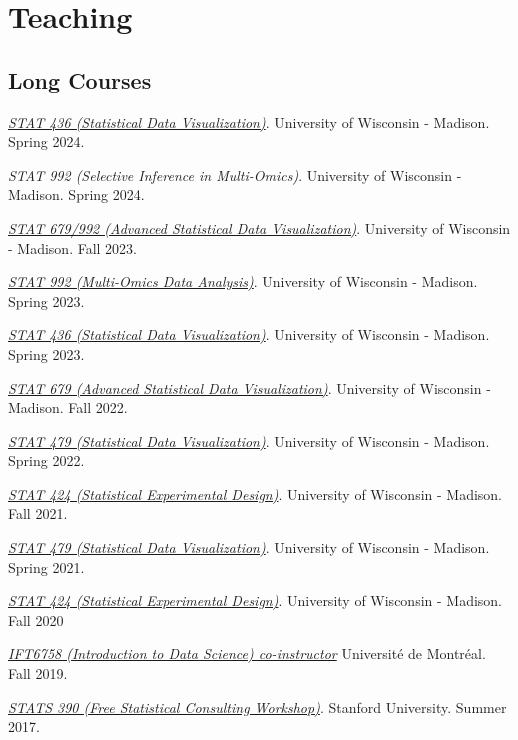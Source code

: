 \documentclass[letterpaper]{article}
\renewenvironment{itemize}{
  \begin{list}{}{
    \setlength{\leftmargin}{1.5em}
  }
}{
  \end{list}
}
\begin{document}
\section*{Teaching}

\subsection*{Long Courses}

\begin{itemize}
\item \textit{\href{https://krisrs1128.github.io/stat436_s24/}{STAT 436 (Statistical Data Visualization)}}.
University of Wisconsin - Madison. Spring 2024.
\item \textit{STAT 992 (Selective Inference in Multi-Omics)}. University of Wisconsin - Madison. Spring 2024.
\item \textit{\href{https://krisrs1128.github.io/stat992_f23/}{STAT 679/992 (Advanced Statistical Data Visualization)}}.
University of Wisconsin - Madison. Fall 2023.
\item \textit{\href{https://krisrs1128.github.io/stat992_s23/}{STAT 992 (Multi-Omics Data Analysis)}}. 
University of Wisconsin - Madison. Spring 2023.
\item \textit{\href{https://krisrs1128.github.io/stat436_s23/}{STAT 436 (Statistical Data Visualization)}}.
University of Wisconsin - Madison. Spring 2023.
\item \textit{\href{https://krisrs1128.github.io/stat679_notes/}{STAT 679 (Advanced Statistical Data Visualization)}}.
University of Wisconsin - Madison. Fall 2022.
\item \textit{\href{https://github.com/krisrs1128/stat479_s22}{STAT 479 (Statistical Data Visualization)}}.
University of Wisconsin - Madison. Spring 2022.
\item \textit{\href{https://krisrs1128.github.io/stat424_f21}{STAT 424 (Statistical Experimental Design)}}.
University of Wisconsin - Madison. Fall 2021.
\item \textit{\href{https://krisrs1128/github.io/stat479/}{STAT 479 (Statistical Data Visualization)}}.
University of Wisconsin - Madison. Spring 2021.
\item \textit{\href{https://mediaspace.wisc.edu/channel/STAT424Fall2020/180027062}{STAT
424 (Statistical Experimental Design)}}. University of Wisconsin - Madison. Fall
2020
\item \textit{\href{https://ift6758.github.io/}{IFT6758 (Introduction to Data Science) co-instructor}}
Universit\'e de Montr\'eal. Fall 2019.
\item \href{https://www.overleaf.com/10240923zrkwyvndkwnn#/37916755/}{\textit{STATS 390 (Free Statistical Consulting Workshop)}}.
  Stanford University. Summer 2017.
\end{itemize}
\end{document}
